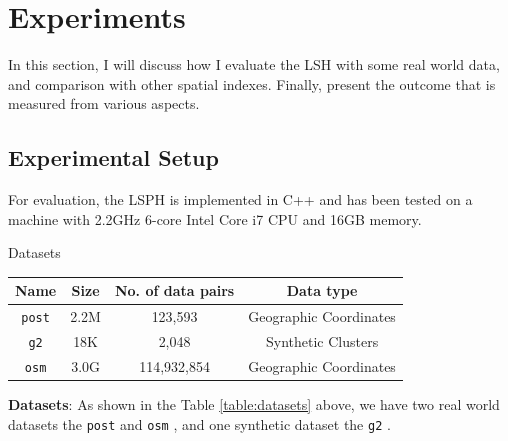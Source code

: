 \chapter{Experiments}
In this section, I will discuss how I evaluate the LSH with some real world data, and comparison with other spatial indexes. Finally, present the outcome that is measured from various aspects.

\section{Experimental Setup}

For evaluation, the LSPH is implemented in C++ and has been tested on a machine with 2.2GHz 6-core Intel Core i7 CPU and 16GB memory. 

\begin{center}
\begin{adjustbox}{max width={\textwidth}, max totalheight={\textheight},keepaspectratio}
\begin{threeparttable}
\caption{Datasets}

\begin{tabular}{c|c c c}
    \toprule
    \textbf{Name}    &\textbf{Size}  & \textbf{No. of data pairs} & \textbf{Data type}             \\ \midrule 
    \texttt{post}    & 2.2M & 123,593             &Geographic Coordinates \\
    \texttt{g2}      & 18K  & 2,048               & Synthetic Clusters    \\
    \texttt{osm}     & 3.0G & 114,932,854         &Geographic Coordinates \\
     \bottomrule
\end{tabular}
\end{threeparttable}
\label{table:datasets}
\end{adjustbox}
\end{center}

\textbf{Datasets}: As shown in the Table \ref{table:datasets} above, we have two real world datasets the \texttt{post} \cite{rtreeportal} and \texttt{osm} \cite{OpenStreetMap}, and one synthetic dataset the \texttt{g2} \cite{G2sets}.

